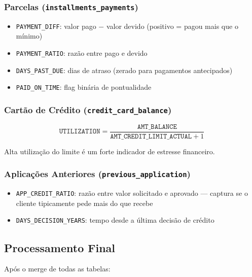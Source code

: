 \documentclass[12pt, a4paper]{article}
\begin{document}
\subsubsection{Parcelas (\texttt{installments\_payments})}

\begin{itemize}
    \item \texttt{PAYMENT\_DIFF}: valor pago $-$ valor devido (positivo = pagou mais que o m\'inimo)
    \item \texttt{PAYMENT\_RATIO}: raz\~ao entre pago e devido
    \item \texttt{DAYS\_PAST\_DUE}: dias de atraso (zerado para pagamentos antecipados)
    \item \texttt{PAID\_ON\_TIME}: flag bin\'aria de pontualidade
\end{itemize}

\subsubsection{Cart\~ao de Cr\'edito (\texttt{credit\_card\_balance})}

\begin{equation}
    \texttt{UTILIZATION} = \frac{\texttt{AMT\_BALANCE}}{\texttt{AMT\_CREDIT\_LIMIT\_ACTUAL} + 1}
\end{equation}

Alta utiliza\c{c}\~ao do limite \'e um forte indicador de estresse financeiro.

\subsubsection{Aplica\c{c}\~oes Anteriores (\texttt{previous\_application})}

\begin{itemize}
    \item \texttt{APP\_CREDIT\_RATIO}: raz\~ao entre valor solicitado e aprovado ---
          captura se o cliente tipicamente pede mais do que recebe
    \item \texttt{DAYS\_DECISION\_YEARS}: tempo desde a \'ultima decis\~ao de cr\'edito
\end{itemize}

\subsection{Processamento Final}

Ap\'os o merge de todas as tabelas:
\end{document}
